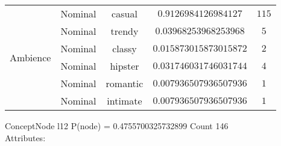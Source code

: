 \begin{tabular}{|c|c|c|c|c|}
\multirow{6}{*}{Ambience} & Nominal & casual & $0.9126984126984127$ & $115$ \\ \cline{2-4} 
 & Nominal & trendy & $0.03968253968253968$ & $5$ \\ \cline{2-4} 
 & Nominal & classy & $0.015873015873015872$ & $2$ \\ \cline{2-4} 
 & Nominal & hipster & $0.031746031746031744$ & $4$ \\ \cline{2-4} 
 & Nominal & romantic & $0.007936507936507936$ & $1$ \\ \cline{2-4} 
 & Nominal & intimate & $0.007936507936507936$ & $1$ \\ \hline 
\end{tabular}


 
ConceptNode l12 \hspace{1cm} P(node) = 0.4755700325732899 \hspace{1cm} Count 146
\\ Attributes: \\ 
